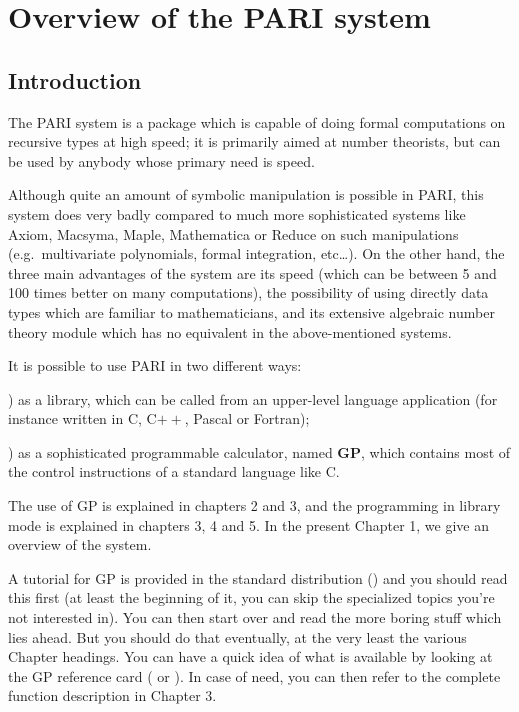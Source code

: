 %
%
\chapter{Overview of the PARI system}

\section{Introduction}

\noindent
The PARI system is a package which is capable of doing formal computations
on recursive types at high speed; it is primarily aimed at number
theorists, but can be used by anybody whose primary need is speed.

Although quite an amount of symbolic manipulation is possible in PARI, this
system does very badly compared to much more sophisticated systems like
Axiom, Macsyma, Maple, Mathematica or Reduce on such manipulations
(e.g.~multivariate polynomials, formal integration, etc\dots). On the other
hand, the three main advantages of the system are its speed (which can be
between 5 and 100 times better on many computations), the possibility of
using directly data types which are familiar to mathematicians, and its
extensive algebraic number theory module which has no equivalent in the
above-mentioned systems.

It is possible to use PARI in two different ways:

) as a library, which can be called from an upper-level language
application (for instance written in C, C$++$, Pascal or Fortran);

) as a sophisticated programmable calculator, named {\bf GP}, which
contains most of the control instructions of a standard language like C.

The use of GP is explained in chapters 2 and 3, and the programming in library
mode is explained in chapters 3, 4 and 5. In the present Chapter 1, we give
an overview of the system.

 A tutorial for GP is provided in the standard
distribution () and you should read this first (at
least the beginning of it, you can skip the specialized topics you're not
interested in). You can then start over and read the more boring stuff which
lies ahead. But you should do that eventually, at the very least the various
Chapter headings. You can have a quick idea of what is available by looking
at the GP reference card ( or ). In case
of need, you can then refer to the complete function description in Chapter 3.

